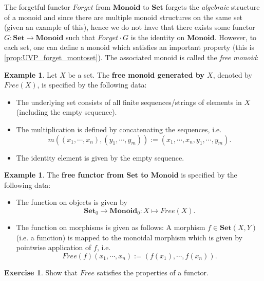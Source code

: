 \documentclass[a4paper,10pt]{scrartcl}
\theoremstyle{plain}
\theoremstyle{definition}
\newtheorem{exa}[thm]{Example}
\newtheorem{exer}[thm]{Exercise}
\newcommand{\Catb}[1]{\mathbf{#1}}
\newcommand{\SET}{\Catb{Set}}
\newcommand{\MON}{\Catb{Monoid}}
\newcommand{\Ob}[1]{{#1}_0}
\newcommand{\CHom}[3]{{#1}(#2,#3)}
\newcommand{\Comp}{\cdot}
\begin{document}
The forgetful functor $Forget$ from $\MON$ to $\SET$ forgets the \textit{algebraic} structure of a monoid and since there are multiple monoid structures on the same set (given an example of this), hence we do not have that there exists some functor $G: \SET\to \MON$ such that $Forget\Comp G$ is the identity on $\MON$. However, to each set, one can define a monoid which satisfies an important property (this is \cref{prop:UVP_forget_montoset}). The associated monoid is called the \textit{free monoid}:
\begin{exa} Let $X$ be a set. The \textbf{free monoid generated by $X$}, denoted by $Free(X)$, is specified by the following data:
\begin{itemize}
\item The underlying set consists of all finite sequences/strings of elements in $X$ (including the empty sequence).
\item The multiplication is defined by concatenating the sequences, i.e. 
$$m\left((x_1,\cdots,x_n),(y_1,\cdots,y_m)\right) := (x_1,\cdots,x_n,y_1,\cdots,y_m).$$
\item The identity element is given by the empty sequence.
\end{itemize}
\end{exa}

\begin{exa} The \textbf{free functor from $\SET$ to $\MON$} is specified by the following data:
\begin{itemize}
\item The function on objects is given by 
\[
\Ob{\SET}\to \Ob{\MON}: X\mapsto Free(X).
\]
\item The function on morphisms is given as follows: A morphism $f \in \CHom{\SET}{X}{Y}$ (i.e. a function) is mapped to the monoidal morphism which is given by pointwise application of $f$, i.e.
\[
Free(f)(x_1,\cdots,x_n) := (f(x_1),\cdots, f(x_n)).
\]
\end{itemize}
\end{exa}

\begin{exer} Show that $Free$ satisfies the properties of a functor.
\end{exer}
\end{document}
